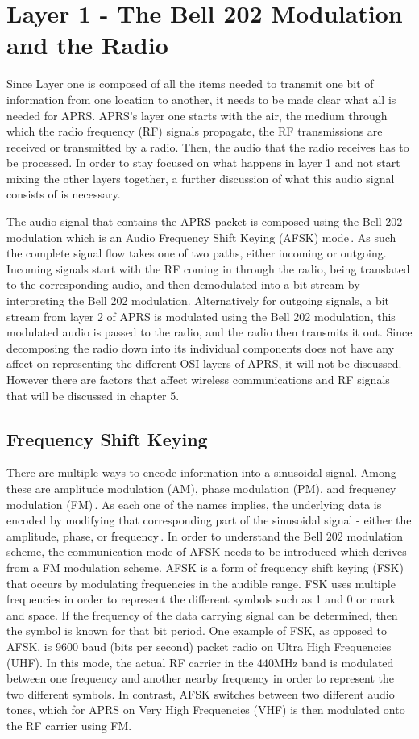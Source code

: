 \section{Layer 1 - The Bell 202 Modulation and the Radio}
Since Layer one is composed of all the items needed to transmit one bit of information from one location to another, it needs to be made clear what all is needed for APRS. APRS's layer one starts with the air, the medium through which the radio frequency (RF) signals propagate, the RF transmissions are received or transmitted by a radio. Then, the audio that the radio receives has to be processed. In order to stay focused on what happens in layer 1 and not start mixing the other layers together, a further discussion of what this audio signal consists of is necessary.

The audio signal that contains the APRS packet is composed using the Bell 202 modulation which is an Audio Frequency Shift Keying (AFSK) mode\,\cite{ITUV23,Goleniewski2006}. As such the complete signal flow takes one of two paths, either incoming or outgoing. Incoming signals start with the RF coming in through the radio, being translated to the corresponding audio, and then demodulated into a bit stream by interpreting the Bell 202 modulation. Alternatively for outgoing signals, a bit stream from layer 2 of APRS is modulated using the Bell 202 modulation, this modulated audio is passed to the radio, and the radio then transmits it out. Since decomposing the radio down into its individual components does not have any affect on representing the different OSI layers of APRS, it will not be discussed. However there are factors that affect wireless communications and RF signals that will be discussed in chapter 5.

\subsection{Frequency Shift Keying}
There are multiple ways to encode information into a sinusoidal signal. Among these are amplitude modulation (AM), phase modulation (PM), and frequency modulation (FM)\,\cite{Goleniewski2006}. As each one of the names implies, the underlying data is encoded by modifying that corresponding part of the sinusoidal signal - either the amplitude, phase, or frequency\,\cite{Instruments2014}. In order to understand the Bell 202 modulation scheme, the communication mode of AFSK needs to be introduced which derives from a FM modulation scheme. AFSK is a form of frequency shift keying (FSK) that occurs by modulating frequencies in the audible range. FSK uses multiple frequencies in order to represent the different symbols such as 1 and 0 or mark and space. If the frequency of the data carrying signal can be determined, then the symbol is known for that bit period. One example of FSK, as opposed to AFSK, is 9600 baud (bits per second) packet radio on Ultra High Frequencies (UHF). In this mode, the actual RF carrier in the 440MHz band is modulated between one frequency and another nearby frequency in order to represent the two different symbols. In contrast, AFSK switches between two different audio tones, which for APRS on Very High Frequencies (VHF) is then modulated onto the RF carrier using FM.


